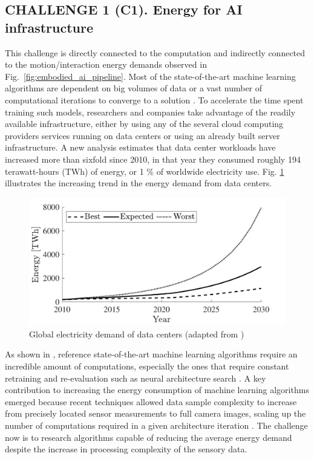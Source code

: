 \subsection{\textbf{CHALLENGE 1} (C1). Energy for AI infrastructure}
This challenge is directly connected to the computation and indirectly connected to the motion/interaction energy demands observed in Fig.~\ref{fig:embodied_ai_pipeline}.
Most of the state-of-the-art machine learning algorithms are dependent on big volumes of data or a vast number of computational iterations to converge to a solution \cite{Strubell2019EnergyAP}. To accelerate the time spent training such models, researchers and companies take advantage of the readily available infrastructure, either by using any of the several cloud computing providers services running on data centers or using an already built server infrastructure. A new analysis estimates that data center workloads have increased more than sixfold since 2010, in that year they consumed roughly 194 terawatt-hours (TWh) of energy, or 1 \% of worldwide electricity use. %
Fig. \ref{fig:dataCenterEnergy} illustrates the increasing trend in the energy demand from data centers.
\begin{figure}[!t]
	\centering
	\includegraphics[width=0.9\columnwidth]{fig/data_center_energy_consumption.pdf}
	\caption{Global electricity demand of data centers (adapted from \cite{andrae2015global})}
	\label{fig:dataCenterEnergy}
\end{figure}
As shown in \cite{Strubell2019EnergyAP}, reference state-of-the-art machine learning algorithms require an incredible amount of computations, especially the ones that require constant retraining and re-evaluation such as neural architecture search \cite{real2019regularized}. A key contribution to increasing the energy consumption of machine learning algorithms emerged because recent techniques allowed data sample complexity to increase from precisely located sensor measurements to full camera images, scaling up the number of computations required in a given architecture iteration \cite{krizhevsky2012imagenet}. The challenge now is to research algorithms capable of reducing the average energy demand despite the increase in processing complexity of the sensory data.

